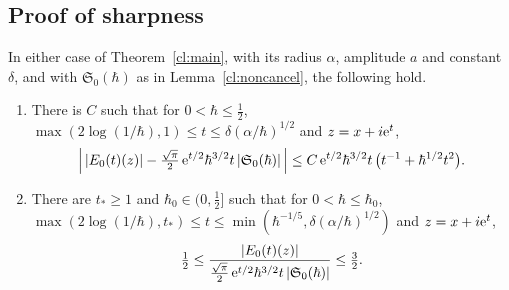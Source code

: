 \subsection{Proof of sharpness}\label{subsec:cl-proof}
\begin{lemma}\label{cl:two}
In either case of Theorem~\ref{cl:main}, with its radius $\alpha$, amplitude $a$ and constant $\delta$, and with $\mathfrak S_0(\hbar)$ as in
Lemma~\ref{cl:noncancel}, the following hold.
\begin{enumerate}
\item[(a)] There is $C$ such that for $0<\hbar\le\tfrac12$, $\max(2\log(1/\hbar),1)\le t\le\delta(\alpha/\hbar)^{1/2}$ and
$z=x+i\mathrm{e}^t$,
\[
\Bigl|\,|E_0(t)(z)|-\tfrac{\sqrt\pi}2\,\mathrm{e}^{t/2}\hbar^{3/2}t\,|\mathfrak S_0(\hbar)|\,\Bigr|\le C\,\mathrm{e}^{t/2}\hbar^{3/2}t\,\bigl(t^{-1}+\hbar^{1/2}t^2\bigr).
\]
\item[(b)] There are $t_*\ge1$ and $\hbar_0\in(0,\tfrac12]$ such that for $0<\hbar\le\hbar_0$,
$\max(2\log(1/\hbar),t_*)\le t\le\min(\hbar^{-1/5},\delta(\alpha/\hbar)^{1/2})$ and $z=x+i\mathrm{e}^t$,
\[
\tfrac12\le\frac{|E_0(t)(z)|}{\tfrac{\sqrt\pi}2\,\mathrm{e}^{t/2}\hbar^{3/2}t\,|\mathfrak S_0(\hbar)|}\le\tfrac32 .
\]
\end{enumerate}
\end{lemma}
